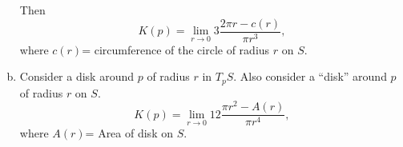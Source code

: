 \begin{enumerate}[(a)]
\begin{center}

          \end{center}
          Then
          \[\label{geometric meaning curvature 2}
            K(p)=\lim_{r\to 0}3\frac{2\pi r-c(r)}{\pi r^3},\tag{2}  
          \]
          where \(c(r)\)= circumference of the circle of radius \(r\)
          on \(S\).
          \item Consider a disk around \(p\) of radius \(r\) in \(T_p S\). 
          Also consider a ``disk'' around \(p\) of radius \(r\) on 
          \(S\).
          \[\label{geometric meaning curvature 3}
            K(p)=\lim_{r\to 0} 12\frac{\pi r^2-A(r)}{\pi r^4},\tag{3}
          \]
          where \(A(r)\)= Area of disk on \(S\).
\end{enumerate}
